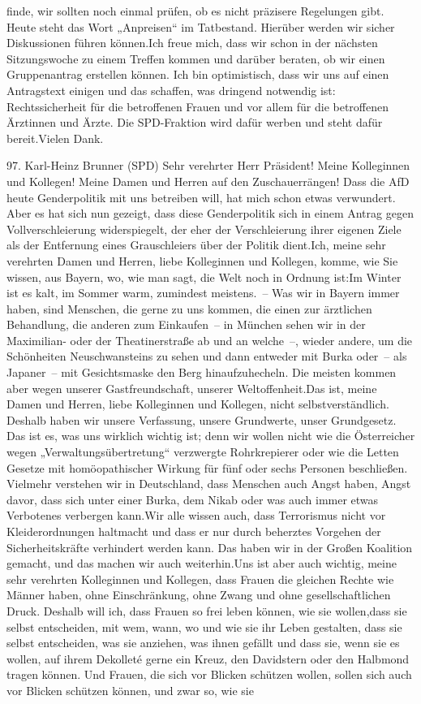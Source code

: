 \documentclass{article}
\begin{document}
finde, wir sollten noch einmal prüfen, ob es nicht präzisere Regelungen gibt. Heute steht das Wort „Anpreisen“ im Tatbestand. Hierüber werden wir sicher Diskussionen führen können.Ich freue mich, dass wir schon in der nächsten Sitzungswoche zu einem Treffen kommen und darüber beraten, ob wir einen Gruppenantrag erstellen können. Ich bin optimistisch, dass wir uns auf einen Antragstext einigen und das schaffen, was dringend notwendig ist: Rechtssicherheit für die betroffenen Frauen und vor allem für die betroffenen Ärztinnen und Ärzte. Die SPD-Fraktion wird dafür werben und steht dafür bereit.Vielen Dank.




	97. Karl-Heinz Brunner (SPD) Sehr verehrter Herr Präsident! Meine Kolleginnen und Kollegen! Meine Damen und Herren auf den Zuschauerrängen! Dass die AfD heute Genderpolitik mit uns betreiben will, hat mich schon etwas verwundert. Aber es hat sich nun gezeigt, dass diese Genderpolitik sich in einem Antrag gegen Vollverschleierung widerspiegelt, der eher der Verschleierung ihrer eigenen Ziele als der Entfernung eines Grauschleiers über der Politik dient.Ich, meine sehr verehrten Damen und Herren, liebe Kolleginnen und Kollegen, komme, wie Sie wissen, aus Bayern, wo, wie man sagt, die Welt noch in Ordnung ist:Im Winter ist es kalt, im Sommer warm, zumindest meistens. – Was wir in Bayern immer haben, sind Menschen, die gerne zu uns kommen, die einen zur ärztlichen Behandlung, die anderen zum Einkaufen – in München sehen wir in der Maximilian- oder der Theatinerstraße ab und an welche –, wieder andere, um die Schönheiten Neuschwansteins zu sehen und dann entweder mit Burka oder – als Japaner – mit Gesichtsmaske den Berg hinauf­zuhecheln. Die meisten kommen aber wegen unserer Gastfreundschaft, unserer Weltoffenheit.Das ist, meine Damen und Herren, liebe Kolleginnen und Kollegen, nicht selbstverständlich. Deshalb haben wir unsere Verfassung, unsere Grundwerte, unser Grundgesetz. Das ist es, was uns wirklich wichtig ist; denn wir wollen nicht wie die Österreicher wegen „Verwaltungsübertretung“ verzwergte Rohrkrepierer oder wie die Letten Gesetze mit homöopathischer Wirkung für fünf oder sechs Personen beschließen. Vielmehr verstehen wir in Deutschland, dass Menschen auch Angst haben, Angst davor, dass sich unter einer Burka, dem Nikab oder was auch immer etwas Verbotenes verbergen kann.Wir alle wissen auch, dass Terrorismus nicht vor Kleiderordnungen haltmacht und dass er nur durch beherztes Vorgehen der Sicherheitskräfte verhindert werden kann. Das haben wir in der Großen Koalition gemacht, und das machen wir auch weiterhin.Uns ist aber auch wichtig, meine sehr verehrten Kolleginnen und Kollegen, dass Frauen die gleichen Rechte wie Männer haben, ohne Einschränkung, ohne Zwang und ohne gesellschaftlichen Druck. Deshalb will ich, dass Frauen so frei leben können, wie sie wollen,dass sie selbst entscheiden, mit wem, wann, wo und wie sie ihr Leben gestalten, dass sie selbst entscheiden, was sie anziehen, was ihnen gefällt und dass sie, wenn sie es wollen, auf ihrem Dekolleté gerne ein Kreuz, den ­Davidstern oder den Halbmond tragen können. Und Frauen, die sich vor Blicken schützen wollen, sollen sich auch vor Blicken schützen können, und zwar so, wie sie 
\end{document}
